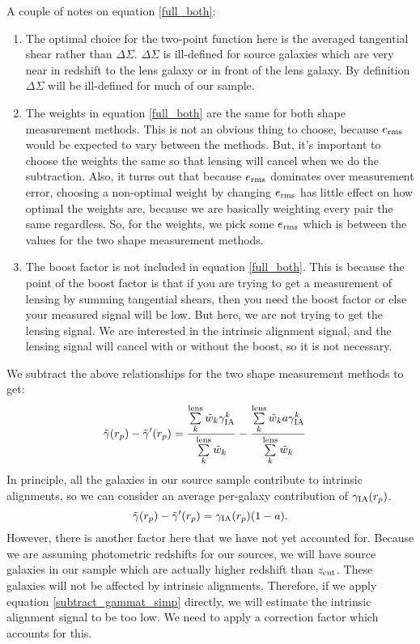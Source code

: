 \documentclass[onecolumn,amsmath,aps,fleqn, superscriptaddress]{revtex4}
\begin{document}
A couple of notes on equation \ref{full_both}:
\begin{enumerate}
\item{The optimal choice for the two-point function here is the averaged tangential shear rather than $\Delta \Sigma$. $\Delta \Sigma$ is ill-defined for source galaxies which are very near in redshift to the lens galaxy or in front of the lens galaxy. By definition $\Delta \Sigma$ will be ill-defined for much of our sample.}
\item{The weights in equation \ref{full_both} are the same for both shape measurement methods. This is not an obvious thing to choose, because $e_{\rm rms}$ would be expected to vary between the methods. But, it's important to choose the weights the same so that lensing will cancel when we do the subtraction. Also, it turns out that because $e_{\rm rms}$ dominates over measurement error, choosing a non-optimal weight by changing $e_{\rm rms}$ has little effect on how optimal the weights are, because we are basically weighting every pair the same regardless. So, for the weights, we pick some $e_{\rm rms}$ which is between the values for the two shape measurement methods.}
\item{The boost factor is not included in equation \ref{full_both}. This is because the point of the boost factor is that if you are trying to get a measurement of lensing by summing tangential shears, then you need the boost factor or else your measured signal will be low. But here, we are not trying to get the lensing signal. We are interested in the intrinsic alignment signal, and the lensing signal will cancel with or without the boost, so it is not necessary.}
\end{enumerate}

We subtract the above relationships for the two shape measurement methods to get:
\begin{align}
\tilde{\gamma}(r_p) - \tilde{\gamma}^\prime(r_p) &= \frac{\sum\limits_{k}^{\rm lens} \tilde{w}_k \gamma_{\rm IA}^k}{\sum\limits_{k}^{\rm lens} \tilde{w}_k} - \frac{\sum\limits_{k}^{\rm lens} \tilde{w}_k a \gamma_{\rm IA}^k}{\sum\limits_{k}^{\rm lens} \tilde{w}_k} 
\label{subtract_gammat}
\end{align}
In principle, all the galaxies in our source sample contribute to intrinsic alignments, so we can consider an average per-galaxy contribution of $\gamma_{\rm IA}(r_p)$.
\begin{equation}
\tilde{\gamma}(r_p) - \tilde{\gamma}^\prime(r_p) = \gamma_{\rm IA}(r_p)(1-a).
\label{subtract_gammat_simp}
\end{equation}
However, there is another factor here that we have not yet accounted for. Because we are assuming photometric redshifts for our sources, we will have source galaxies in our sample which are actually higher redshift than $z_{\rm cut}$. These galaxies will not be affected by intrinsic alignments. Therefore, if we apply equation \ref{subtract_gammat_simp} directly, we will estimate the intrinsic alignment signal to be too low. We need to apply a correction factor which accounts for this. 
\end{document}
